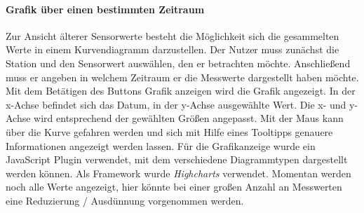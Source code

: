 \paragraph{Grafik über einen bestimmten Zeitraum} Zur Ansicht älterer Sensorwerte besteht die Möglichkeit sich die gesammelten Werte in einem Kurvendiagramm darzustellen. Der Nutzer muss zunächst die Station und den Sensorwert auswählen, den er betrachten möchte. Anschließend muss er angeben in welchem Zeitraum er die Messwerte dargestellt haben möchte. Mit dem Betätigen des Buttons Grafik anzeigen wird die Grafik angezeigt. In der x-Achse befindet sich das Datum, in der y-Achse ausgewählte Wert. Die x- und y-Achse wird entsprechend der gewählten Größen angepasst. Mit der Maus kann über die Kurve gefahren werden und sich mit Hilfe eines Tooltipps genauere Informationen angezeigt werden lassen. Für die Grafikanzeige wurde ein JavaScript Plugin verwendet, mit dem verschiedene Diagrammtypen dargestellt werden können. Als Framework wurde \textit{Highcharts} verwendet. Momentan werden noch alle Werte angezeigt, hier könnte bei einer großen Anzahl an Messwerten eine Reduzierung / Ausdünnung vorgenommen werden.

